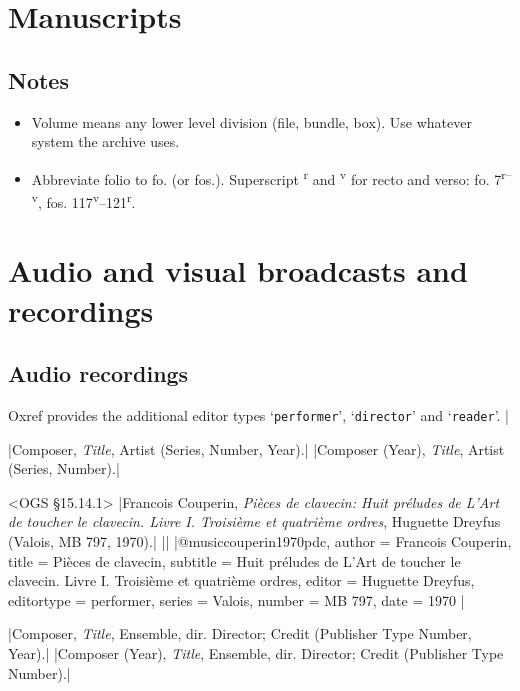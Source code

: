 \documentclass[extrafontsizes,11pt,a4paper,oneside]{memoir}
\newcommand*{\lit}[1]{\textsf{#1}}
\newcommand*{\code}[1]{`\texttt{#1}'}
\begin{document}
\chapter{Manuscripts}\label{sec:ms}


\section{Notes}

\begin{itemize}
  \item Volume means any lower level division (file, bundle, box). Use whatever system the archive uses.
  \item Abbreviate folio to fo. (or fos.). Superscript \textsuperscript{r} and \textsuperscript{v} for recto and verso: fo. 7\textsuperscript{r--v}, fos. 117\textsuperscript{v}--121\textsuperscript{r}.
\end{itemize}

\chapter{Audio and visual broadcasts and recordings}\label{sec:audiovideo}

\section{Audio recordings}

Oxref provides the additional editor types \code{performer}, \code{director} and \code{reader}.
|

\specs
|Composer, \emph{Title}, Artist (Series, Number, Year).|%
|Composer (Year), \emph{Title}, Artist (Series, Number).|

\bibexample<OGS \S15.14.1>
|Francois Couperin, \emph{Pièces de clavecin: Huit préludes de L'Art de toucher le clavecin. Livre I. Troisième et quatrième ordres}, Huguette Dreyfus (Valois, MB 797, 1970).|%
||%
|@music{couperin1970pdc,
  author = {Francois Couperin},
  title = {Pièces de clavecin},
  subtitle = {Huit préludes de L'Art de toucher le clavecin. Livre I. Troisième et quatrième ordres},
  editor = {Huguette Dreyfus},
  editortype = {performer},
  series = {Valois},
  number = {MB 797},
  date = {1970}
}|

\specs
|Composer, \emph{Title}, Ensemble, \lit{dir.} Director; Credit (Publisher Type Number, Year).|%
|Composer (Year), \emph{Title}, Ensemble, \lit{dir.} Director; Credit (Publisher Type Number).|
\end{document}
